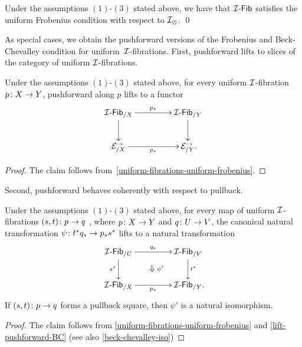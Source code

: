 \documentclass[reqno,10pt,a4paper,oneside,draft]{amsart}
\begin{document}
\begin{theorem} \label{uniform-fibrations-uniform-frobenius}
Under the assumptions $(1)$-$(3)$ stated above, we have that $\Fib{\cal{I}} $ satisfies the uniform Frobenius condition with respect to $\cal{I}_{\otimes}$.
\qed
\end{theorem}

As special cases, we obtain the pushforward versions of the Frobenius and Beck-Chevalley condition for uniform~$\cal{I}$-fibrations.
First, pushforward lifts to slices of the category of uniform $\cal{I}$-fibrations.

\begin{corollary} \label{uniform-fibrations-frobenius-pushforward}
Under the assumptions $(1)$-$(3)$ stated above,  for every uniform $\cal{I}$-fibration
$p \co X \to Y$, pushforward along $p$ lifts to a functor
\[
\xymatrix@C+2em{
  \Fib{\cal{I}}_{/X}
  \ar[r]^{p_*}
  \ar[d]
&
  \Fib{\cal{I}}_{/Y}
  \ar[d]
\\
  \catE_{/X}^\to
  \ar[r]_{p_*}
&
  \catE_{/Y}^\to
\rlap{.}}
\]
\end{corollary}

\begin{proof}
The claim follows from~\cref{uniform-fibrations-uniform-frobenius}.
\end{proof}

Second, pushforward behaves coherently with respect to pullback.

\begin{corollary} \label{uniform-fibrations-BC-pushforward} Under the assumptions $(1)$-$(3)$ stated above, 
for every map of uniform $\cal{I}$-fibrations $(s, t) \co p \to q$ , where  $p \co X \to Y$ and $q \co U \to V$,  the canonical natural transformation $\psi \co t^* q_* \to p_* s^*$ lifts to a natural transformation
\[
\xymatrix@C+2em{
  \Fib{\cal{I}}_{/U}
  \ar[r]^{q_*}
  \ar[d]_{s^*}
  \ar@{}[dr]|{\textstyle\Downarrow \rlap{$\labelstyle \psi'$}}
&
  \Fib{\cal{I}}_{/V}
  \ar[d]^{t^*}
\\
  \Fib{\cal{I}}_{/X}
  \ar[r]_{p_*}
&
  \Fib{\cal{I}}_{/Y}
\rlap{.}}
\]
If $(s, t) \co p \to q$ forms a pullback square, then $\psi'$ is a natural isomorphism.
\end{corollary}

\begin{proof}
The claim follows from \cref{uniform-fibrations-uniform-frobenius} and \cref{lift-pushforward-BC} (see also \cref{beck-chevalley-iso})
\end{proof}
\end{document}
